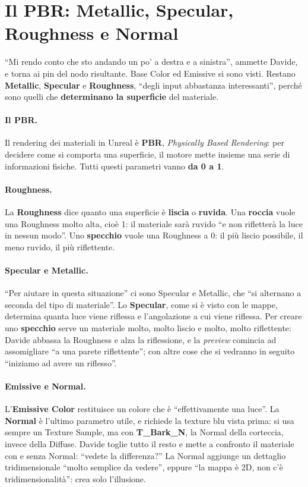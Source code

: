 \section{Il PBR: Metallic, Specular, Roughness e Normal}
\label{ue3:sec:pbr}

``Mi rendo conto che sto andando un po' a destra e a sinistra'', ammette Davide, e
torna ai pin del nodo risultante. Base Color ed Emissive si sono visti. Restano
\textbf{Metallic}, \textbf{Specular} e \textbf{Roughness}, ``degli input abbastanza
interessanti'', perché sono quelli che \textbf{determinano la superficie} del
materiale.

\paragraph{Il PBR.} Il rendering dei materiali in Unreal è \textbf{PBR},
\emph{Physically Based Rendering}: per decidere come si comporta una superficie, il
motore mette insieme una serie di informazioni fisiche. Tutti questi parametri vanno
\textbf{da 0 a 1}.

\paragraph{Roughness.} La \textbf{Roughness} dice quanto una superficie è
\textbf{liscia} o \textbf{ruvida}. Una \textbf{roccia} vuole una Roughness molto alta,
cioè 1: il materiale sarà ruvido ``e non rifletterà la luce in nessun modo''. Uno
\textbf{specchio} vuole una Roughness a 0: il più liscio possibile, il meno ruvido, il
più riflettente.

\paragraph{Specular e Metallic.} ``Per aiutare in questa situazione'' ci sono Specular e
Metallic, che ``si alternano a seconda del tipo di materiale''. Lo
\textbf{Specular}, come si è visto con le mappe, determina quanta luce viene riflessa e
l'angolazione a cui viene riflessa. Per creare uno \textbf{specchio} serve un materiale
molto, molto liscio e molto, molto riflettente: Davide abbassa la Roughness e alza la
riflessione, e la \emph{preview} comincia ad assomigliare ``a una parete riflettente'';
con altre cose che si vedranno in seguito ``iniziamo ad avere un riflesso''.

\paragraph{Emissive e Normal.} L'\textbf{Emissive Color} restituisce un colore che è
``effettivamente una luce''. La \textbf{Normal} è l'ultimo parametro utile, e richiede
la texture blu vista prima: si usa sempre un Texture Sample, ma con
\textbf{T\_Bark\_N}, la Normal della corteccia, invece della Diffuse. Davide toglie
tutto il resto e mette a confronto il materiale con e senza Normal: ``vedete la
differenza?'' La Normal aggiunge un dettaglio tridimensionale ``molto semplice da
vedere'', eppure ``la mappa è 2D, non c'è tridimensionalità'': crea solo l'illusione.

